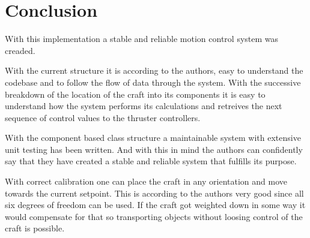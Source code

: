 \section{Conclusion}\label{sec:conclusion}

With this implementation a stable and reliable motion control system was creaded.

With the current structure it is according to the authors, easy to understand the codebase and to follow the flow of data through the system. With the successive breakdown of the location of the craft into its components it is easy to understand how the system performs its calculations and retreives the next sequence of control values to the thruster controllers.

With the component based class structure a maintainable system with extensive unit testing has been written. And with this in mind the authors can confidently say that they have created a stable and reliable system that fulfills its purpose.

With correct calibration one can place the craft in any orientation and move towards the current setpoint. This is according to the authors very good since all six degrees of freedom can be used. If the craft got weighted down in some way it would compensate for that so transporting objects without loosing control of the craft is possible.
